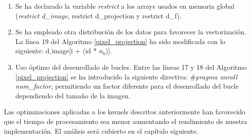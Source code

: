 \begin{enumerate}
    \item Se ha declarado la variable \textit{restrict} a los arrays usados en memoria global (\textit{restrict d\_image}, {restrict d\_projection} y {restrict d\_f}).
    \item Se ha empleado otra distribución de los datos para favorecer la vectorización. La línea 19 del Algoritmo \ref{pixel_projection} ha sido modificada con lo siguiente: d$\_$image[i + (id * $n_{b}$)].
    \item Uso óptimo del desenrollado de bucles. Entre las líneas 17 y 18 del Algoritmo \ref{pixel_projection} se ha introducido la siguiente directiva: \#\textit{pragma unroll num\_factor}, permitiendo un factor diferente para el desenrollado del bucle dependiendo del tamaño de la imagen.  
\end{enumerate}

Las optimizaciones aplicadas a los kernels descritos anteriormente han favorecido que el tiempo de procesamiento sea menor aumentando el rendimiento de nuestra implementación. El análisis será cubierto en el capítulo siguiente.